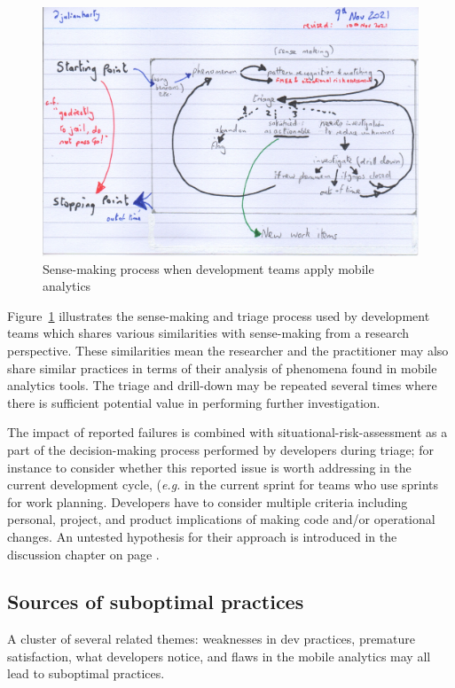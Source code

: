 \begin{figure}
    \centering
    \includegraphics[width=15cm]{images/rough-sketches/practical-sense-making-process-10-nov-2021.jpeg}
    \caption{Sense-making process when development teams apply mobile analytics}
    \label{fig:practical-sense-making-process-when-dev-teams-apply-mobile-analytics}
\end{figure}


Figure~\ref{fig:practical-sense-making-process-when-dev-teams-apply-mobile-analytics} illustrates the sense-making and triage process used by development teams which shares various similarities with sense-making from a research perspective. These similarities mean the researcher and the practitioner may also share similar practices in terms of their analysis of phenomena found in mobile analytics tools. The triage and drill-down may be repeated several times where there is sufficient potential value in performing further investigation. 

The impact of reported failures is combined with situational-risk-assessment as a part of the decision-making process performed by developers during triage; for instance to consider whether this reported issue is worth addressing in the current development cycle, (\textit{e.g.} in the current sprint for teams who use sprints for work planning. Developers have to consider multiple criteria including personal, project, and product implications of making code and/or operational changes. An untested hypothesis for their approach is introduced in the discussion chapter on page \pageref{discussion-decision-making-by-dev-teams-section}.

\subsection{Sources of suboptimal practices}
A cluster of several related themes: weaknesses in dev practices, premature satisfaction, what developers notice, and flaws in the mobile analytics may all lead to suboptimal practices.


